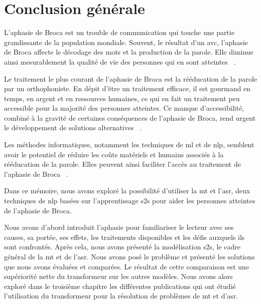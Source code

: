 \chapter*{Conclusion générale}
\label{chap.general-conclusion}

L'aphasie de Broca est un trouble de communication qui touche une partie grandissante de la population mondiale.
Souvent, le résultat d'un \gls{avc}, l'aphasie de Broca affecte le décodage des mots et la production de la parole.
Elle diminue ainsi mesurablement la qualité de vie des personnes qui en sont atteintes%
~\cite{Feigin_Brainin_Norrving_Martins_Sacco_Hacke_Fisher_Pandian_Lindsay_2022,Chapey_2008,Ross_Wertz_2010}.

Le traitement le plus courant de l'aphasie de Broca est la rééducation de la parole par un orthophoniste.
En dépit d'être un traitement efficace, il est gourmand en temps, en argent et en ressources humaines,
ce qui en fait un traitement peu accessible pour la majorité des personnes atteintes.
Ce manque d'accessibilité, combiné à la gravité de certaines conséquences de l'aphasie de Broca,
rend urgent le développement de solutions alternatives%
~\cite{recover,Flowers_Skoretz_Silver_Rochon_Fang_Flamand-Roze_Martino_2016}.

Les méthodes informatiques, notamment les techniques de \gls{ml} et de \gls{nlp},
semblent avoir le potentiel de réduire les coûts matériels et humains associés à la rééducation de la parole.
Elles peuvent ainsi faciliter l'accès au traitement de l'aphasie de Broca%
~\cite{Smaili_Langlois_Pribil_2022,Qin_Lee_Kong_Lin_2022,Misra_Mishra_Gandhi_2022}.

Dans ce mémoire, nous avons exploré la possibilité d'utiliser la \gls{mt} et l'\gls{asr},
deux techniques de \gls{nlp} basées sur l'apprentissage \gls{s2s} 
pour aider les personnes atteintes de l'aphasie de Broca.

Nous avons d'abord introduit l'aphasie pour familiariser le lecteur avec
ses causes, sa portée, ses effets, les traitements disponibles et les défis auxquels ils sont confrontés.
Après cela, nous avons présenté la modélisation \gls{s2s}, le cadre général de la \gls{mt} et de l'\gls{asr}.
Nous avons posé le problème et présenté les solutions que nous avons évaluées et comparées.
Le résultat de cette comparaison est une supériorité nette du transformeur sur les autres modèles.
Nous avons alors exploré dans le troisième chapitre les différentes publications qui ont étudié
l'utilisation du transformeur pour la résolution de problèmes de \gls{mt} et d'\gls{asr}.


